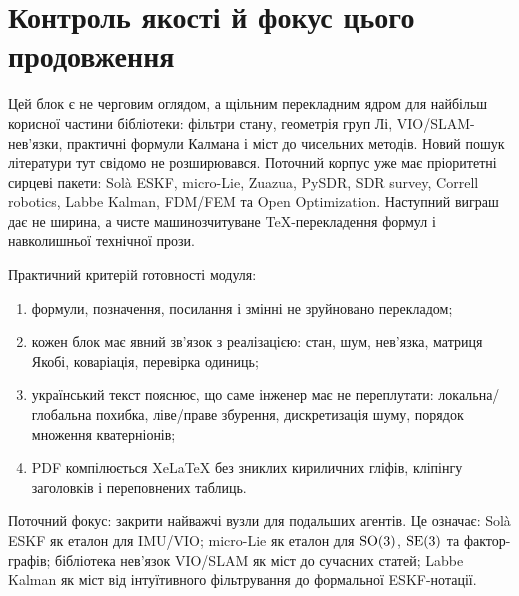 \section{Контроль якості й фокус цього продовження}

Цей блок є не черговим оглядом, а щільним перекладним ядром для найбільш корисної частини бібліотеки: фільтри стану, геометрія груп Лі, VIO/SLAM-нев'язки, практичні формули Калмана і міст до чисельних методів. Новий пошук літератури тут свідомо не розширювався. Поточний корпус уже має пріоритетні сирцеві пакети: Solà ESKF, micro-Lie, Zuazua, PySDR, SDR survey, Correll robotics, Labbe Kalman, FDM/FEM та Open Optimization. Наступний виграш дає не ширина, а чисте машинозчитуване TeX-перекладення формул і навколишньої технічної прози.

Практичний критерій готовності модуля:
\begin{enumerate}
\item формули, позначення, посилання і змінні не зруйновано перекладом;
\item кожен блок має явний зв'язок з реалізацією: стан, шум, нев'язка, матриця Якобі, коваріація, перевірка одиниць;
\item український текст пояснює, що саме інженер має не переплутати: локальна/глобальна похибка, ліве/праве збурення, дискретизація шуму, порядок множення кватерніонів;
\item PDF компілюється XeLaTeX без зниклих кириличних гліфів, кліпінгу заголовків і переповнених таблиць.
\end{enumerate}

Поточний фокус: закрити найважчі вузли для подальших агентів. Це означає: Solà ESKF як еталон для IMU/VIO; micro-Lie як еталон для $\mathrm{SO}(3)$, $\mathrm{SE}(3)$ та фактор-графів; бібліотека нев'язок VIO/SLAM як міст до сучасних статей; Labbe Kalman як міст від інтуїтивного фільтрування до формальної ESKF-нотації.
